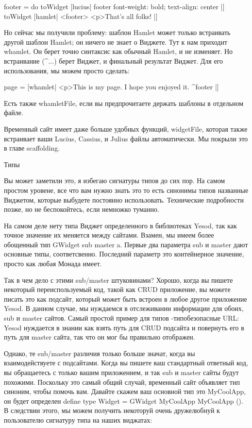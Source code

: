 footer = do
    toWidget [lucius| footer { font-weight: bold; text-align: center } |]
    toWidget [hamlet|
<footer>
    <p>That's all folks!
|]

Но сейчас мы получили проблему: шаблон Hamlet может только встраивать другой шаблон Hamlet; он ничего не знает о Виджете. Тут к нам приходит whamlet. Он берет точно синтаксис как обычный Hamlet, и не изменяет. Но встраивание (^{...}) берет Виджет, и финальный результат Виджет. Для его использования, мы можем просто сделать:

page = [whamlet|
<p>This is my page. I hope you enjoyed it.
^{footer}
|]

Есть также whamletFile, если вы предпрочитаете держать шаблоны в отдельном файле.

Временный сайт имеет даже больше удобных функций, widgetFile, которая также встраивает ваши Lucius, Cassius, и Julius файлы автоматически. Мы покрыли это в главе scaffolding.

Типы

Вы может заметили это, я избегаю сигнатуры типов до сих пор. На самом простом уровене, все что вам нужно знать это то есть синонимы типов названные Виджетом, которые выбудете постоянно использовать. Технические подробности позже, но не беспокойтесь, если немножко туманно.

На самом деле нету типа Виджет определенного в библиотеках Yesod, так как точное значение их меняется между сайтами. Взамен, мы имеем более обощенный тип GWidget sub master a. Первые два параметра sub и master дают основные типы, соответсвенно. Последний параметр это контейнерное значение, просто как любая Монада имеет.

Так в чем дело с этими sub/master штуковинами? Хорошо, когда вы пишете некоторый переиспользуемый код, такой как CRUD приложение, вы можете писать это как подсайт, который может быть встроен в любое другое приложение Yesod. В данном случае, мы нуждаемся в отслеживании информации для обоих, sub и master сайтов. Самый простой пример для типов -типобезопасные URL: Yesod нуждается в знании как взять путь для CRUD подсайта и повернуть его в путь для master сайта, так что он мог бы правильно отображен.

Однако, те sub/master различия только больше значат, когда вы взаимодействуете с подсайтами. Когда вы пишете ваш стандартный ответный код, вы обращаетесь с только вашим приложением, и так sub и master сайты будут похожими. Поскольку это самый общий случай, временный сайт объявляет тип синоним, чтобы помочь вам. Давайте скажем ваш основной тип это MyCoolApp, он будет определен define type Widget = GWidget MyCoolApp MyCoolApp (). В следствии этого, мы можем получить некоторуй очень дружелюбнуй к пользователю сигнатуру типа на наших виджатах:

